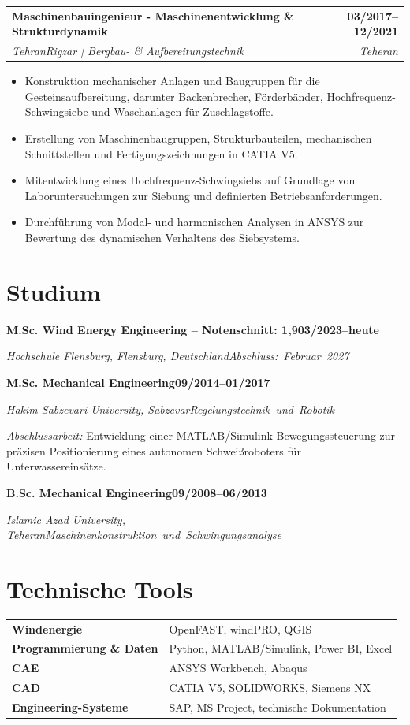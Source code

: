 \documentclass[10pt,a4paper]{article}
\makeatletter
\newcommand{\cvjob}[4]{%
  \begin{tabularx}{\linewidth}{@{}Xr@{}}
    \textbf{#1} & \textbf{#2}\\[1pt]
    \textit{#3} & \textit{#4}
  \end{tabularx}
  \vspace{0.05em}
}
\newcommand{\cvedu}[4]{%
  \noindent
  \textbf{#1}\hfill\mbox{\textbf{#2}}\par
  \vspace{2pt}
  \noindent
  \textit{#3}\hfill\mbox{\textit{#4}}\par
  \vspace{0.3em}
}
\makeatother
\begin{document}
\cvjob{Maschinenbauingenieur - Maschinenentwicklung \& Strukturdynamik}{03/2017--12/2021}{TehranRigzar | Bergbau- \& Aufbereitungstechnik}{Teheran}
\begin{itemize}
  \item Konstruktion mechanischer Anlagen und Baugruppen für die Gesteinsaufbereitung, darunter Backenbrecher, Förderbänder, Hochfrequenz-Schwingsiebe und Waschanlagen für Zuschlagstoffe.

  \item Erstellung von Maschinenbaugruppen, Strukturbauteilen, mechanischen Schnittstellen und Fertigungszeichnungen in CATIA V5.

  \item Mitentwicklung eines Hochfrequenz-Schwingsiebs auf Grundlage von Laboruntersuchungen zur Siebung und definierten Betriebsanforderungen.

  \item Durchführung von Modal- und harmonischen Analysen in ANSYS zur Bewertung des dynamischen Verhaltens des Siebsystems.

\end{itemize}

\section{Studium}

\cvedu
  {M.Sc. Wind Energy Engineering -- Notenschnitt: 1,9}
  {03/2023--heute}
  {Hochschule Flensburg, Flensburg, Deutschland}
  {Abschluss: Februar 2027}

\cvedu
  {M.Sc. Mechanical Engineering}
  {09/2014--01/2017}
  {Hakim Sabzevari University, Sabzevar}
  {Regelungstechnik und Robotik}

\vspace{0.6mm}

\textit{Abschlussarbeit:} Entwicklung einer MATLAB/Simulink-Bewegungssteuerung zur präzisen Positionierung eines autonomen Schweißroboters für Unterwassereinsätze.

\vspace{1.2mm}

\cvedu
  {B.Sc. Mechanical Engineering}
  {09/2008--06/2013}
  {Islamic Azad University, Teheran}
  {Maschinenkonstruktion und Schwingungsanalyse}
\section{Technische Tools}
\begin{tabularx}{\linewidth}{@{}>{\raggedright\arraybackslash}p{4.75cm}X@{}}
\textbf{Windenergie} & OpenFAST, windPRO, QGIS\\
\textbf{Programmierung \& Daten} & Python, MATLAB/Simulink, Power BI, Excel\\
\textbf{CAE} & ANSYS Workbench, Abaqus\\
\textbf{CAD} & CATIA V5, SOLIDWORKS, Siemens NX\\
\textbf{Engineering-Systeme} & SAP, MS Project, technische Dokumentation
\end{tabularx}
\end{document}

